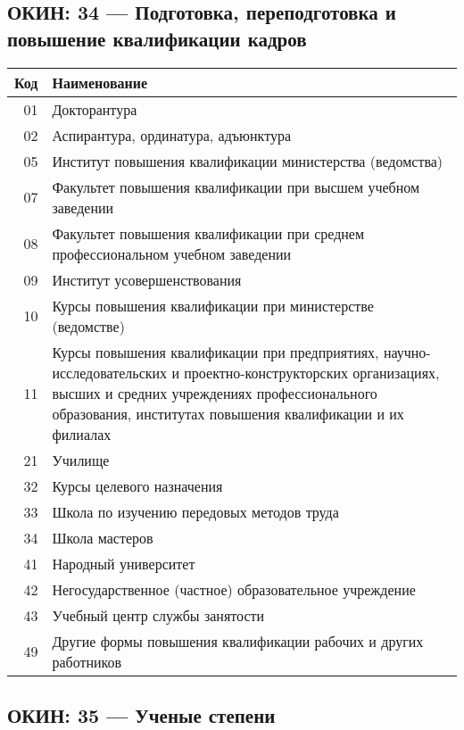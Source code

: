 \documentclass[10pt, a4paper, titlepage]{article}
\begin{document}
\subsection{ОКИН: 34 --- Подготовка, переподготовка и повышение квалификации кадров}

\begin{center}
    \begin{longtable}{rp{}}
        \hline
        \textbf{Код} & \textbf{Наименование} \\ \hline
        01 & Докторантура \\
        02 & Аспирантура, ординатура, адъюнктура \\
        05 & Институт повышения квалификации министерства (ведомства) \\
        07 & Факультет повышения квалификации при высшем учебном заведении \\
        08 & Факультет повышения квалификации при среднем профессиональном учебном заведении \\
        09 & Институт усовершенствования \\
        10 & Курсы повышения квалификации при министерстве (ведомстве) \\
        11 & Курсы повышения квалификации при предприятиях, научно-исследовательских и проектно-конструкторских организациях, высших и средних учреждениях профессионального образования, институтах повышения квалификации и их филиалах \\
        21 & Училище \\
        32 & Курсы целевого назначения \\
        33 & Школа по изучению передовых методов труда \\
        34 & Школа мастеров \\
        41 & Народный университет \\
        42 & Негосударственное (частное) образовательное учреждение \\
        43 & Учебный центр службы занятости \\
        49 & Другие формы повышения квалификации рабочих и других работников \\
    \end{longtable}
\end{center}

\subsection{ОКИН: 35 --- Ученые степени}
\end{document}
